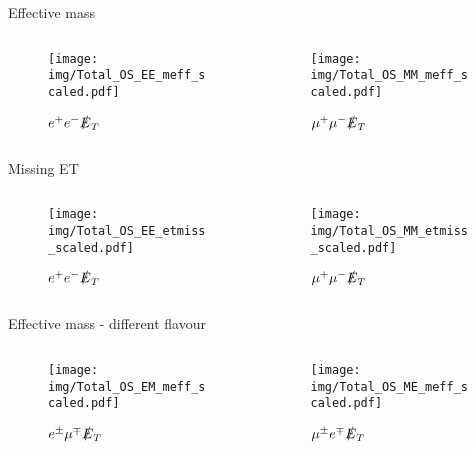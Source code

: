 \documentclass{beamer}
\begin{document}
\begin{frame}{Effective mass}
  \begin{columns}
    \begin{column}{0.45\textwidth}\begin{figure}
      \caption{$e^{+}e^{-}\slashed{E}_{T}$}
      \texttt{[image: img/Total\_OS\_EE\_meff\_scaled.pdf]}
    \end{figure}\end{column}
    \begin{column}{0.45\textwidth}\begin{figure}
      \caption{$\mu^{+}\mu^{-}\slashed{E}_{T}$}
      \texttt{[image: img/Total\_OS\_MM\_meff\_scaled.pdf]}
    \end{figure}\end{column}
  \end{columns}
\end{frame}

\begin{frame}{Missing ET}
  \begin{columns}
    \begin{column}{0.45\textwidth}\begin{figure}
      \caption{$e^{+}e^{-}\slashed{E}_{T}$}
      \texttt{[image: img/Total\_OS\_EE\_etmiss\_scaled.pdf]}
    \end{figure}\end{column}
    \begin{column}{0.45\textwidth}\begin{figure}
      \caption{$\mu^{+}\mu^{-}\slashed{E}_{T}$}
      \texttt{[image: img/Total\_OS\_MM\_etmiss\_scaled.pdf]}
    \end{figure}\end{column}
  \end{columns}
\end{frame}

\begin{frame}{Effective mass - different flavour}
  \begin{columns}
    \begin{column}{0.45\textwidth}\begin{figure}
      \caption{$e^{\pm}\mu^{\mp}\slashed{E}_{T}$}
      \texttt{[image: img/Total\_OS\_EM\_meff\_scaled.pdf]}
    \end{figure}\end{column}
    \begin{column}{0.45\textwidth}\begin{figure}
      \caption{$\mu^{\pm}e^{\mp}\slashed{E}_{T}$}
      \texttt{[image: img/Total\_OS\_ME\_meff\_scaled.pdf]}
    \end{figure}\end{column}
  \end{columns}
\end{frame}
\end{document}
